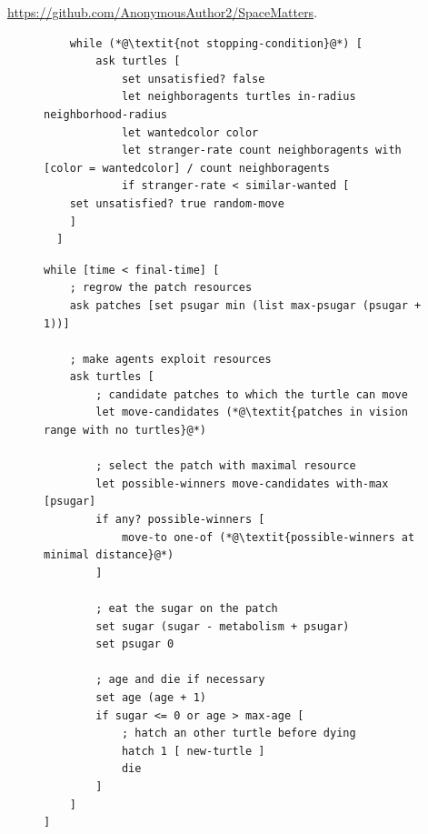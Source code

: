 \documentclass[preprint,5p,times,twocolumn,authoryear]{elsarticle}
\begin{document}
 \url{https://github.com/AnonymousAuthor2/SpaceMatters}.



\begin{figure}
	\caption{}
	\begin{mdframed}
	\begin{lstlisting}
	while (*@\textit{not stopping-condition}@*) [
    	ask turtles [
    		set unsatisfied? false
    		let neighboragents turtles in-radius neighborhood-radius
    		let wantedcolor color
    		let stranger-rate count neighboragents with [color = wantedcolor] / count neighboragents
    		if stranger-rate < similar-wanted [
    set unsatisfied? true random-move
    ]
  ]
    \end{lstlisting}
    \end{mdframed}
\end{figure}



\begin{figure}
\caption{}
\begin{mdframed}
\begin{lstlisting}
while [time < final-time] [
	; regrow the patch resources
    ask patches [set psugar min (list max-psugar (psugar + 1))]
        
    ; make agents exploit resources
    ask turtles [
    	; candidate patches to which the turtle can move
    	let move-candidates (*@\textit{patches in vision range with no turtles}@*)
    	
    	; select the patch with maximal resource
 		let possible-winners move-candidates with-max [psugar]
  		if any? possible-winners [
  			move-to one-of (*@\textit{possible-winners at minimal distance}@*)
  		]
            
        ; eat the sugar on the patch
        set sugar (sugar - metabolism + psugar)
  		set psugar 0
            
        ; age and die if necessary
    	set age (age + 1)
    	if sugar <= 0 or age > max-age [
    		; hatch an other turtle before dying
      		hatch 1 [ new-turtle ]
      		die
    	]
  	]
]
\end{lstlisting}
\end{mdframed}
\end{figure}
\end{document}
